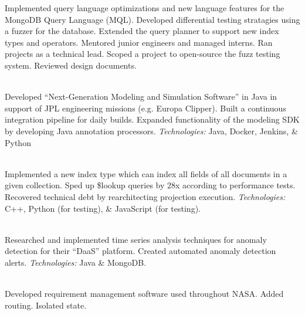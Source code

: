 \documentclass[11pt,letter,sans]{moderncv}
\newcommand{\dingbat}{\color{color1}{\large\photon}}
\begin{document}
Implemented query {\color{color1}language optimizations} and {\color{color1}new language features} for the MongoDB Query Language (MQL).
Developed {\color{color1}differential testing} stratagies using a fuzzer for the database.
Extended the {\color{color1}query planner} to support new index types and operators.
Mentored junior engineers and managed interns.
Ran projects as a {\color{color1}technical lead}.
Scoped a project to {\color{color1}open-source} the fuzz testing system.
Reviewed design documents.\\
\centerline{\dingbat}
\\
Developed ``Next-Generation Modeling and Simulation Software'' in Java in support of JPL engineering missions (e.g. Europa Clipper). Built a {\color{color1}continuous integration} pipeline for daily builds.
Expanded functionality of the {\color{color1}modeling SDK} by developing Java annotation processors. \textit{Technologies:} Java, Docker, Jenkins, \& Python
\\
\centerline{\dingbat}
\\
Implemented a new index type which can index all fields of all documents in a given collection.
Sped up \$lookup queries by 28x according to performance tests.
Recovered technical debt by rearchitecting projection execution.
\textit{Technologies:} C++, Python (for testing), \& JavaScript (for testing).
\\
\centerline{\dingbat}
\\
Researched and implemented time series analysis techniques for anomaly detection for their ``DaaS'' platform. Created automated anomaly detection alerts.
\textit{Technologies:} Java \& MongoDB.
\\
\centerline{\dingbat}
\\
Developed requirement management software used throughout NASA.
Added routing. Isolated state.
\end{document}
